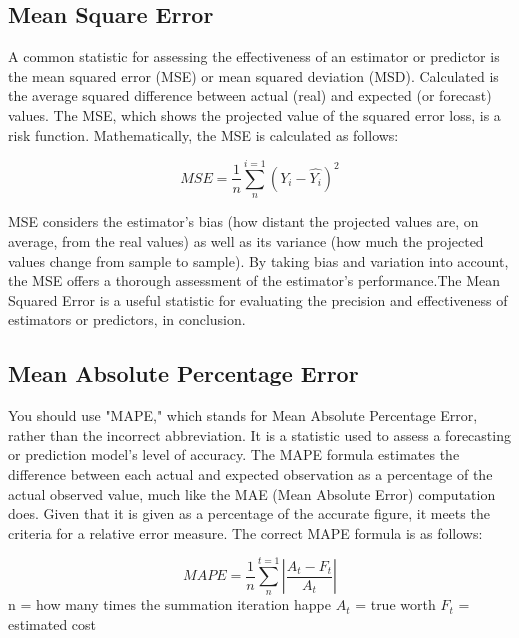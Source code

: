 \documentclass[a4paper,fleqn]{cas-sc}
\begin{document}
  \subsection{Mean Square Error}
  A common statistic for assessing the effectiveness of an estimator or predictor is the mean squared error (MSE) or mean squared deviation (MSD). Calculated is the average squared difference between actual (real) and expected (or forecast) values. The MSE, which shows the projected value of the squared error loss, is a risk function.\cite{kumari2021deep} Mathematically, the MSE is calculated as follows:\cite{}
  
  \begin{equation}
  MSE = \frac{1}{n}\sum_{n}^{i=1}(Y_i-\hat{Y_i})^{2}
  \end{equation}
  
  MSE considers the estimator’s bias (how distant the projected values are, on average, from the real values) as well as its variance (how much the projected values change from sample to sample). By taking bias and variation into account, the MSE offers a thorough assessment of the estimator’s performance.The Mean Squared Error is a  useful statistic for evaluating the precision and effectiveness of estimators or predictors, in conclusion.\cite{gupta2023long}
  
  
  \subsection{Mean Absolute Percentage Error}
  You should use "MAPE," which stands for Mean Absolute Percentage Error, rather than the incorrect abbreviation.
  It is a statistic used to assess a forecasting or prediction model’s level of accuracy. The MAPE formula estimates the difference between each actual and expected observation as a percentage of the actual observed value, much like the MAE (Mean Absolute Error) computation does. Given that it is given as a percentage of the accurate figure, it meets the criteria for a relative error measure. The correct MAPE formula is as follows:\cite{dhingra2023pseudo}
  
  \begin{equation}
  MAPE = \frac{1}{n}\sum_{n}^{t=1}|\frac{A_t-F_t}{A_t}|
  \end{equation}
  n = how many times the summation iteration happe
  ${A_t}$ = true worth 
  ${F_t }$ = estimated cost
  
\end{document}
